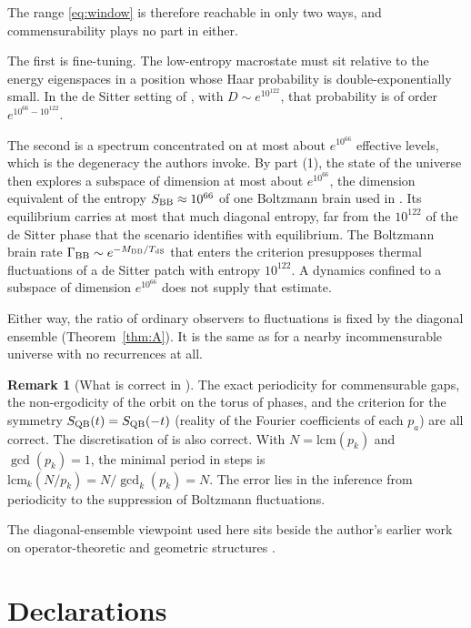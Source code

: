 \documentclass[11pt]{amsart}
\theoremstyle{definition}
\newtheorem{remark}[theorem]{Remark}
\begin{document}
The range \eqref{eq:window} is therefore reachable in only two ways, and commensurability plays no part in either.

The first is fine-tuning. The low-entropy macrostate must sit relative to the energy eigenspaces in a position whose Haar probability is double-exponentially small. In the de Sitter setting of \cite{CDD26}, with $D\sim e^{10^{122}}$, that probability is of order $e^{10^{66}-10^{122}}$.

The second is a spectrum concentrated on at most about $e^{10^{66}}$ effective levels, which is the degeneracy the authors invoke. By part (1), the state of the universe then explores a subspace of dimension at most about $e^{10^{66}}$, the dimension equivalent of the entropy $S_{\rm BB}\approx10^{66}$ of one Boltzmann brain used in \cite{CDD26}. Its equilibrium carries at most that much diagonal entropy, far from the $10^{122}$ of the de Sitter phase that the scenario identifies with equilibrium. The Boltzmann brain rate $\Gamma_{\rm BB}\sim e^{-M_{\rm BB}/T_{\rm dS}}$ that enters the criterion presupposes thermal fluctuations of a de Sitter patch with entropy $10^{122}$. A dynamics confined to a subspace of dimension $e^{10^{66}}$ does not supply that estimate.

Either way, the ratio of ordinary observers to fluctuations is fixed by the diagonal ensemble (Theorem~\ref{thm:A}). It is the same as for a nearby incommensurable universe with no recurrences at all.

\begin{remark}[What is correct in \cite{CDD26}]
The exact periodicity for commensurable gaps, the non-ergodicity of the orbit on the torus of phases, and the criterion for the symmetry $S_{\rm QB}(t)=S_{\rm QB}(-t)$ (reality of the Fourier coefficients of each $p_a$) are all correct. The discretisation of \cite{Car23} is also correct. With $N=\mathrm{lcm}(p_k)$ and $\gcd(p_k)=1$, the minimal period in steps is $\mathrm{lcm}_k(N/p_k)=N/\gcd_k(p_k)=N$. The error lies in the inference from periodicity to the suppression of Boltzmann fluctuations.
\end{remark}

The diagonal-ensemble viewpoint used here sits beside the author's earlier work on operator-theoretic and geometric structures \cite{Bha22a,Bha22b,BSN26}.

\section*{Declarations}
\end{document}
